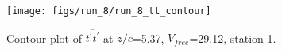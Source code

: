 \begin{figure}[H]
\centering
\texttt{[image: figs/run\_8/run\_8\_tt\_contour]}
\caption{Contour plot of $\overline{t^\prime t^\prime}$ at $z/c$=5.37, $V_{free}$=29.12, station 1.}
\label{fig:run_8_tt_contour}
\end{figure}


